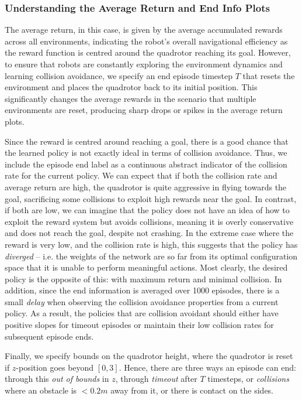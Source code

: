 \subsubsection{Understanding the Average Return and End Info Plots}
The average return, in this case, is given by the average accumulated rewards across all environments, indicating the robot's overall navigational efficiency as the reward function is centred around the quadrotor reaching its goal. 
However, to ensure that robots are constantly exploring the environment dynamics and learning collision avoidance, we specify an end episode timestep $T$ that resets the environment and places the quadrotor back to its initial position. This significantly changes the average rewards in the scenario that multiple environments are reset, producing sharp drops or spikes in the average return plots.

Since the reward is centred around reaching a goal, there is a good chance that the learned policy is not exactly ideal in terms of collision avoidance. Thus, we include the episode end label as a continuous abstract indicator of the collision rate for the current policy. We can expect that if both the collision rate and average return are high, the quadrotor is quite aggressive in flying towards the goal, sacrificing some collisions to exploit high rewards near the goal. In contrast, if both are low, we can imagine that the policy does not have an idea of how to exploit the reward system but avoids collisions, meaning it is overly conservative and does not reach the goal, despite not crashing. In the extreme case where the reward is very low, and the collision rate is high, this suggests that the policy has \textit{diverged} -- i.e. the weights of the network are so far from its optimal configuration space that it is unable to perform meaningful actions. Most clearly, the desired policy is the opposite of this: with maximum return and minimal collision. 
In addition, since the end information is averaged over 1000 episodes, there is a small \textit{delay} when observing the collision avoidance properties from a current policy. As a result, the policies that are collision avoidant should either have positive slopes for timeout episodes or maintain their low collision rates for subsequent episode ends. 

Finally, we specify bounds on the quadrotor height, where the quadrotor is reset if $z$-position goes beyond $[0, 3]$. Hence, there are three ways an episode can end: through this \textit{out of bounds} in $z$, through \textit{timeout} after $T$ timesteps, or \textit{collisions} where an obstacle is $<0.2m$ away from it, or there is contact on the sides.
 
